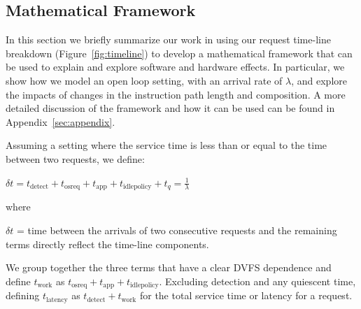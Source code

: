 
\subsection{Mathematical Framework}
\label{sec:model}

In this section we briefly summarize our work in using our request time-line breakdown (Figure~\ref{fig:timeline}) to develop a mathematical framework that can be used to explain and explore software and hardware effects.  In particular, we show how we model an open loop setting, with an arrival rate of $\lambda$, and explore the impacts of changes in the instruction path length and composition.  A more detailed discussion of the framework and how it can be used can be found in Appendix~\ref{sec:appendix}.   

Assuming a setting where the service time is less than or equal to the time between two requests, we define:

$\boxed{\delta t = t_{\text{detect}} + t_{\text{osreq}} + t_{\text{app}} + t_{\text{idlepolicy}} + t_q} = \frac{1}{\lambda}$

where 

$\delta t$ = time between the arrivals of two consecutive requests and the remaining terms directly reflect the time-line components.  

We group together the three terms that have a clear DVFS dependence and define
$t_{\text{work}}$ as $t_{\text{osreq}} + t_{\text{app}} + t_{\text{idlepolicy}}$.  Excluding detection and any quiescent time, defining $t_{\text{latency}}$ as $t_{\text{detect}} + t_{\text{work}}$ for the total service time or latency for a request.

